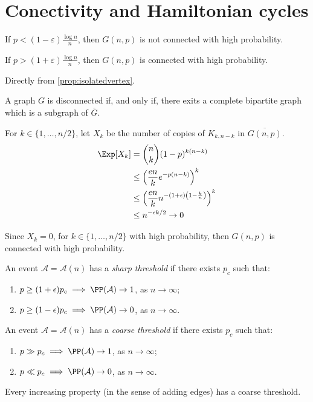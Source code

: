 \newpage
\section{Conectivity and Hamiltonian cycles}

\begin{thm}
	If $p < (1-\varepsilon)\frac{\log{n}}{n}$, then $G(n, p)$ is not connected with high probability.

	If $p > (1+\varepsilon)\frac{\log{n}}{n}$, then $G(n, p)$ is connected with high probability.
\end{thm}
\begin{dem}
	Directly from \cref{prop:isolatedvertex}.
\end{dem}
\begin{dem}
	A graph $G$ is disconnected if, and only if, there exits a complete bipartite graph which is a subgraph of $\overline G$. 

	For $k \in \{1, \dots, n/2\}$, let $X_k$ be the number of copies of $K_{k, n-k}$ in $\overline{G(n,p)}$.
	\begin{align*}
		\Exp[X_k] &= \binom{n}{k}(1-p)^{k(n-k)} \\
				  &\le \left(\frac{en}{k}e^{-p(n-k)}\right)^k \\
				  &\le \left(\frac{en}{k}n^{-\left(1+\epsilon\right)\left(1-\frac{k}{n}\right)}\right)^k\\
				  &\le n^{-\epsilon k /2} \to 0
	\end{align*}

	Since $X_k = 0$, for $k \in \{1, \dots, n/2\}$ with high probability, then $G(n,p)$ is connected with high probability.
\end{dem}

\begin{defn}
	An event $\mathcal A = \mathcal A(n)$ has a \emph{sharp threshold} if there exists $p_c$ such that:
	\begin{enumerate}[label = \textbullet] 
		\item $p \ge (1+\epsilon)p_c \implies \PP(\mathcal A) \to 1$, as  $n \to \infty$;
		\item $p \ge (1-\epsilon)p_c \implies \PP(\mathcal A) \to 0$, as  $n \to \infty$.
	\end{enumerate}
\end{defn}

\begin{defn}
	An event $\mathcal A = \mathcal A(n)$ has a \emph{coarse threshold} if there exists $p_c$ such that:
	\begin{enumerate}[label = \textbullet] 
		\item $p \gg p_c \implies \PP(\mathcal A) \to 1$, as  $n \to \infty$;
		\item $p \ll p_c \implies \PP(\mathcal A) \to 0$, as  $n \to \infty$.
	\end{enumerate}
\end{defn}

\begin{thm}
	Every increasing property (in the sense of adding edges) has a coarse threshold.
\end{thm}

